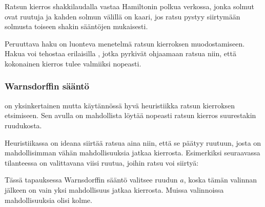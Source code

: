 Ratsun kierros shakkilaudalla vastaa Hamiltonin polkua verkossa,
jonka solmut ovat ruutuja ja kahden solmun välillä on kaari,
jos ratsu pystyy siirtymään solmusta toiseen shakin sääntöjen mukaisesti.

Peruuttava haku on luonteva menetelmä ratsun kierroksen muodostamiseen.
Hakua voi tehostaa erilaisilla ,
jotka pyrkivät ohjaamaan ratsua niin, että kokonainen kierros
tulee valmiiksi nopeasti.

\subsubsection{Warnsdorffin sääntö}


 on yksinkertainen mutta käytännössä hyvä heuristiikka
ratsun kierroksen etsimiseen.
Sen avulla on mahdollista löytää nopeasti ratsun kierros
suurestakin ruudukosta.

Heuristiikassa on ideana siirtää ratsua aina niin,
että se päätyy ruutuun, josta on mahdollisimman vähän
mahdollisuuksia jatkaa kierrosta.
Esimerkiksi seuraavassa tilanteessa on valittavana
viisi ruutua, joihin ratsu voi siirtyä:
\begin{center}
\end{center}
Tässä tapauksessa Warnsdorffin sääntö valitsee ruudun $a$,
koska tämän valinnan jälkeen on vain yksi mahdollisuus
jatkaa kierrosta. Muissa valinnoissa mahdollisuuksia olisi kolme.



